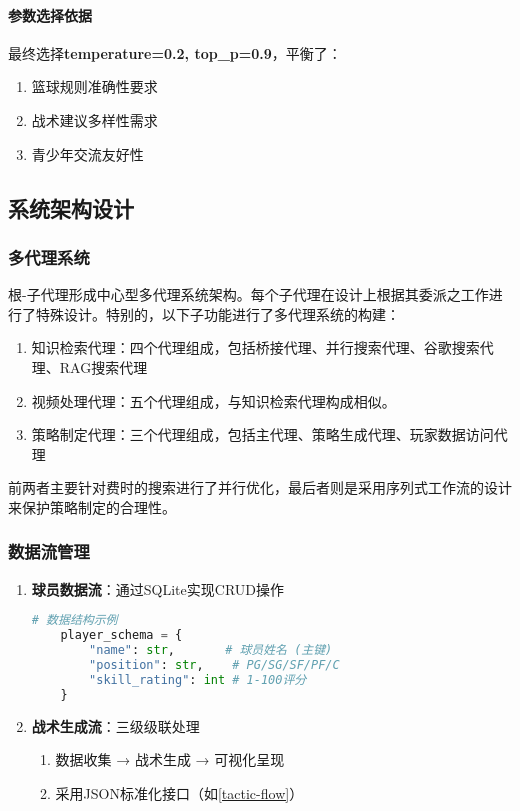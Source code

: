 \documentclass{article}
\theoremstyle{plain}
\theoremstyle{definition}
\theoremstyle{remark}
\begin{document}
\paragraph{参数选择依据}
最终选择\textbf{temperature=0.2, top\_p=0.9}，平衡了：
\begin{enumerate}
\item 篮球规则准确性要求
\item 战术建议多样性需求
\item 青少年交流友好性
\end{enumerate}


\subsection{系统架构设计}

\subsubsection{多代理系统}
根-子代理形成中心型多代理系统架构。每个子代理在设计上根据其委派之工作进行了特殊设计。特别的，以下子功能进行了多代理系统的构建：
\begin{enumerate}
    \item 知识检索代理：四个代理组成，包括桥接代理、并行搜索代理、谷歌搜索代理、RAG搜索代理
    \item 视频处理代理：五个代理组成，与知识检索代理构成相似。
    \item 策略制定代理：三个代理组成，包括主代理、策略生成代理、玩家数据访问代理
\end{enumerate}

前两者主要针对费时的搜索进行了并行优化，最后者则是采用序列式工作流的设计来保护策略制定的合理性。


\subsubsection{数据流管理}
\begin{enumerate}
    \item \textbf{球员数据流}：通过SQLite实现CRUD操作
    \begin{lstlisting}[language=Python]
    # 数据结构示例
    player_schema = {
        "name": str,       # 球员姓名 (主键)
        "position": str,    # PG/SG/SF/PF/C
        "skill_rating": int # 1-100评分
    }
    \end{lstlisting}
    
    \item \textbf{战术生成流}：三级级联处理
    \begin{enumerate}
        \item 数据收集 → 战术生成 → 可视化呈现
        \item 采用JSON标准化接口（如\cref{tactic-flow}）
    \end{enumerate}
\end{enumerate}
\end{document}
